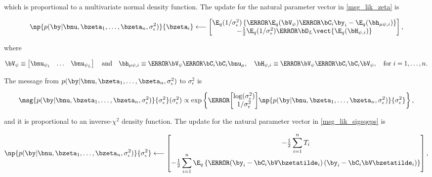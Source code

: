\documentclass[12pt]{article}
\def\sigsqeps{\sigma^2_{\epsilon}}
\def\numu{\bnu_\mu}
\def\Vpsi{\bV_\psi}
\newcommand\nupsi[1]{\bnu_{\psi_{#1}}}
\newcommand\hmupsi[1]{\bh_{\mu \psi, i}}
\newcommand\Hpsi[1]{\bH_{\psi, i}}
\theoremstyle{plain}
\theoremstyle{definition}
\theoremstyle{remark}
\begin{document}
\noindent which is proportional to a multivariate normal density function.
The update for the natural parameter vector in \eqref{msg_lik_zeta} is

\begin{equation}
	\np{p (\by | \bnu, \bzeta_1, \dots, \bzeta_n, \sigsqeps)}{\bzeta_i}
		\longleftarrow
			\begin{bmatrix}
				\E_q (1/\sigsqeps) \left\{
					\T{\E_q (\Vpsi)} \T{\bC_i} \by_i - \E_q (\hmupsi{i})
				\right\} \\
				-\frac12 \E_q (1/\sigsqeps) \T{\bD_L} \vect \{ \E_q (\Hpsi{i}) \}
			\end{bmatrix},
\label{np_lik_zeta}
\end{equation}

\noindent where

\begin{equation}
	\Vpsi \equiv \begin{bmatrix}
		\nupsi{1} & \dots & \nupsi{L}
	\end{bmatrix} \quad
	\text{and} \quad
	\hmupsi{i} \equiv \T{\Vpsi} \T{\bC_i} \bC_i \numu, \quad
	\Hpsi{i} \equiv \T{\Vpsi} \T{\bC_i} \bC_i \Vpsi, \quad
	\text{for $i = 1, \dots, n$}.
\label{psi_related_defns}
\end{equation}

The message from $p (\by | \bnu, \bzeta_1, \dots, \bzeta_n, \sigsqeps)$ to $\sigsqeps$ is

\begin{equation}
	\msg{p (\by | \bnu, \bzeta_1, \dots, \bzeta_n, \sigsqeps)}{\sigsqeps} (\sigsqeps) \propto
		\exp \left\{
			\T{\begin{bmatrix}
				\log (\sigsqeps) \\
				1/\sigsqeps
			\end{bmatrix}}
			\np{p (\by | \bnu, \bzeta_1, \dots, \bzeta_n, \sigsqeps)}{\sigsqeps}
		\right\},
\label{msg_lik_sigsqeps}
\end{equation}

\noindent and it is proportional to an inverse-$\chi^2$ density function. The update for the natural parameter vector in
\eqref{msg_lik_sigsqeps} is

\begin{equation}
	\np{p (\by | \bnu, \bzeta_1, \dots, \bzeta_n, \sigsqeps)}{\sigsqeps}
		\longleftarrow
			\begin{bmatrix}
				-\frac12 \displaystyle\sum_{i=1}^n T_i \\
				-\frac12 \displaystyle\sum_{i=1}^n \E_q \left\{ \T{\left(
					\by_i - \bC_i \bV \bzetatilde_i
				\right)} \left(
					\by_i - \bC_i \bV \bzetatilde_i
				\right) \right\}
			\end{bmatrix},
\label{np_lik_sigsqeps}
\end{equation}
\end{document}
